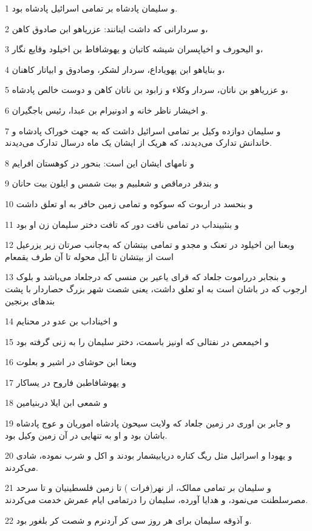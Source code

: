 \par 1 و سلیمان پادشاه بر تمامی اسرائیل پادشاه بود.
\par 2 و سردارانی که داشت اینانند: عزریاهو ابن صادوق کاهن،
\par 3 و الیحورف و اخیاپسران شیشه کاتبان و یهوشافاط بن اخیلود وقایع نگار،
\par 4 و بنایاهو ابن یهویاداع، سردار لشکر، وصادوق و ابیاتار کاهنان،
\par 5 و عزریاهو بن ناتان، سردار وکلاء و زابود بن ناتان کاهن و دوست خالص پادشاه،
\par 6 و اخیشار ناظر خانه و ادونیرام بن عبدا، رئیس باجگیران.
\par 7 و سلیمان دوازده وکیل بر تمامی اسرائیل داشت که به جهت خوراک پادشاه و خاندانش تدارک می‌دیدند، که هریک از ایشان یک ماه درسال تدارک می‌دیدند.
\par 8 و نامهای ایشان این است: بنحور در کوهستان افرایم
\par 9 و بندقر درماقص و شعلبیم و بیت شمس و ایلون بیت حانان
\par 10 و بنحسد در اربوت که سوکوه و تمامی زمین حافر به او تعلق داشت
\par 11 و بنئبینداب در تمامی نافت دور که تافت دختر سلیمان زن او بود
\par 12 وبعنا ابن اخیلود در تعنک و مجدو و تمامی بیتشان که به‌جانب صرتان زیر یزرعیل است از بیتشان تا آبل محوله تا آن طرف یقمعام
\par 13 و بنجابر درراموت جلعاد که قرای یاعیر بن منسی که درجلعاد می‌باشد و بلوک ارجوب که در باشان است به او تعلق داشت، یعنی شصت شهر بزرگ حصاردار با پشت بندهای برنجین
\par 14 و اخیناداب بن عدو در محنایم
\par 15 و اخیمعص در نفتالی که اونیز باسمت، دختر سلیمان را به زنی گرفته بود
\par 16 وبعنا ابن حوشای در اشیر و بعلوت
\par 17 و یهوشافاطبن فاروح در یساکار
\par 18 و شمعی ابن ایلا دربنیامین
\par 19 و جابر بن اوری در زمین جلعاد که ولایت سیحون پادشاه اموریان و عوج پادشاه باشان بود و او به تنهایی در آن زمین وکیل بود.
\par 20 و یهودا و اسرائیل مثل ریگ کناره دریابیشمار بودند و اکل و شرب نموده، شادی می‌کردند.
\par 21 و سلیمان بر تمامی ممالک، از نهر(فرات ) تا زمین فلسطینیان و تا سرحد مصرسلطنت می‌نمود، و هدایا آورده، سلیمان را درتمامی ایام عمرش خدمت می‌کردند.
\par 22 و آذوقه سلیمان برای هر روز سی کر آردنرم و شصت کر بلغور بود.
